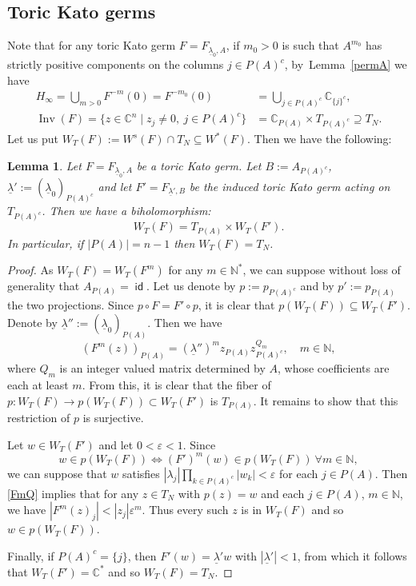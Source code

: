 \documentclass[JEP,XML,SOM,Unicode,NoFloatCountersInSection]{cedram}
\newtheorem{lemma}[theorem]{Lemma}
\theoremstyle{definition}
\let\epsilon\varepsilon
\let\la\lambda
\let\un\underline
\newcommand{\CC}{\mathbb{C}}
\newcommand{\NN}{\mathbb{N}}
\DeclareMathOperator{\id}{\mathsf{id}}
\DeclareMathOperator{\Inv}{Inv}
\begin{document}
\subsection{Toric Kato germs}

Note that for any toric Kato germ $F=F_{\un\la_0,A}$, if $m_0>0$ is such that $A^{m_0}$ has strictly positive components on the columns $j\in P(A)^c$, by~Lem\-ma~\ref{permA} we have
\begin{align*}
H_\infty=\bigcup_{m>0}F^{-m}(0)=F^{-m_0}(0)&=\bigcup_{j\in P(A)^c} \CC_{\{j\}^c},\\
\Inv(F)=\{z\in\CC^n\mid z_j\neq 0, \ j\in P(A)^c\}&=\CC_{P(A)}\times T_{P(A)^c}\supseteq T_N.
\end{align*}
Let us put $W_T(F):=W^s(F)\cap T_N\subseteq W^*(F)$. Then we have the following:

\begin{lemma}\label{splitWs}
Let $F=F_{\un\la_0,A}$ be a toric Kato germ. Let $B:=A_{P(A)^c}$, $\un\la':=(\un\la_0)_{P(A)^c}$ and let $F'=F_{\un\la',B}$ be the induced toric Kato germ acting on $T_{P(A)^c}$. Then we have a biholomorphism:
\begin{equation*}
W_T(F)=T_{P(A)}\times W_T(F').
\end{equation*}
In particular, if $|P(A)|=n-1$ then $W_T(F)=T_N$.
\end{lemma}
\begin{proof}
As $W_T(F)=W_T(F^m)$ for any $m\in\NN^*$, we can suppose without loss of generality that $A_{P(A)}=\id$. Let us denote by $p:=p_{P(A)^c}$ and by $p':=p_{P(A)}$ the two projections. Since $p\circ F=F'\circ p$, it is clear that $p(W_T(F))\subseteq W_T(F')$. Denote by $\un\la'':=(\un\la_0)_{P(A)}$. Then we have
\begin{equation}\label{FmQ}
(F^m(z))_{P(A)}=(\un\la'')^mz_{P(A)}z_{P(A)^c}^{Q_m}, \quad m\in\NN,
\end{equation}
where $Q_m$ is an integer valued matrix determined by $A$, whose coefficients are each at least $m$. From this, it is clear that the fiber of $p:W_T(F)\to p(W_T(F))\subset W_T(F')$ is $T_{P(A)}$. It remains to show that this restriction of $p$ is surjective.

Let $w\in W_T(F')$ and let $0<\epsilon<1$. Since
\[
w\in p(W_T(F))\iff (F')^m(w)\in p(W_T(F))\ \forall m\in\NN,
\]
we can suppose that $w$ satisfies $|\la_j|\prod_{k\in P(A)^c}|w_k|<\epsilon$ for each $j\in P(A)$. Then \eqref{FmQ} implies that for any $z\in T_N$ with $p(z)=w$ and each $j\in P(A)$, $m\in\NN$, we have $|F^m(z)_j|<|z_j|\epsilon^m$. Thus every such $z$ is in $W_T(F)$ and so $w\in p(W_T(F))$.

Finally, if $P(A)^c=\{j\}$, then $F'(w)=\un\la' w$ with $|\un\la'|<1$, from which it follows that $W_T(F')=\CC^*$ and so $W_T(F)=T_N$.
\end{proof}
\end{document}
